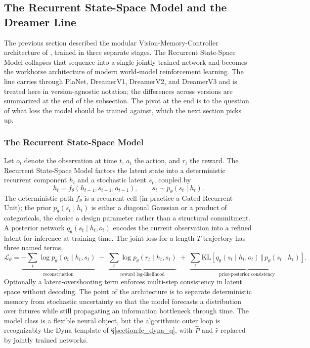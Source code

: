 \subsection{The Recurrent State-Space Model and the Dreamer Line}
\label{section:fc_rssm}

The previous section described the modular Vision-Memory-Controller architecture of \citet{HaSchmidhuber2018}, trained in three separate stages. The Recurrent State-Space Model collapses that sequence into a single jointly trained network and becomes the workhorse architecture of modern world-model reinforcement learning. The line carries through PlaNet, DreamerV1, DreamerV2, and DreamerV3 and is treated here in version-agnostic notation; the differences across versions are summarized at the end of the subsection. The pivot at the end is to the question of what loss the model should be trained against, which the next section picks up.

\subsubsection{The Recurrent State-Space Model}
\label{section:fc_rssm_transition}

Let $o_t$ denote the observation at time $t$, $a_t$ the action, and $r_t$ the reward. The Recurrent State-Space Model factors the latent state into a deterministic recurrent component $h_t$ and a stochastic latent $s_t$, coupled by
\[ h_t = f_\theta(h_{t-1}, s_{t-1}, a_{t-1}), \qquad s_t \sim p_\theta(s_t \mid h_t). \]
The deterministic path $f_\theta$ is a recurrent cell (in practice a Gated Recurrent Unit); the prior $p_\theta(s_t \mid h_t)$ is either a diagonal Gaussian or a product of categoricals, the choice a design parameter rather than a structural commitment. A posterior network $q_\theta(s_t \mid h_t, o_t)$ encodes the current observation into a refined latent for inference at training time. The joint loss for a length-$T$ trajectory has three named terms,
\[ \mathcal{L}_\theta = \underbrace{-\sum_t \log p_\theta(o_t \mid h_t, s_t)}_{\text{reconstruction}} \;-\; \underbrace{\sum_t \log p_\theta(r_t \mid h_t, s_t)}_{\text{reward log-likelihood}} \;+\; \underbrace{\sum_t \mathrm{KL}\!\left[ q_\theta(s_t \mid h_t, o_t) \,\Vert\, p_\theta(s_t \mid h_t) \right]}_{\text{prior-posterior consistency}}. \]
Optionally a latent-overshooting term enforces multi-step consistency in latent space without decoding. The point of the architecture is to separate deterministic memory from stochastic uncertainty so that the model forecasts a distribution over futures while still propagating an information bottleneck through time. The model class is a flexible neural object, but the algorithmic outer loop is recognizably the Dyna template of \S\ref{section:fc_dyna_q}, with $\widehat P$ and $\widehat r$ replaced by jointly trained networks.

